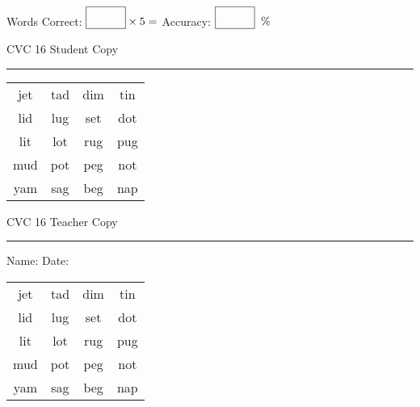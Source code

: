 \documentclass{memoir}
\begin{document}
\small

Words Correct: $\fbox{\phantom{\huge 100}} \times 5 = $ Accuracy: $\fbox{\phantom{\huge 100}}\;\; \%$ 

\vfill

\newpage


\footnotesize \noindent
CVC 16 \hfill Student Copy
\smallskip
\hrule

\Large

\setlength{\tabcolsep}{14pt}
\def\arraystretch{2}

{\selectfont


\begin{vplace}[0.5]
\begin{center}
\begin{tabular}{cccc}
jet & tad & dim & tin \\
lid & lug & set & dot \\
lit & lot & rug & pug \\
mud & pot & peg & not \\
yam & sag & beg & nap \\
\end{tabular}
\end{center}
\end{vplace}

}

\newpage

\footnotesize \noindent
CVC 16 \hfill Teacher Copy
\smallskip
\hrule

\small

\vfill

\noindent
Name: \underline{\hspace{1.75in}} \hfill Date: \underline{\hspace{1in}}

\Large

{\selectfont


\begin{vplace}[0.5]
\begin{center}
\begin{tabular}{cccc}
jet & tad & dim & tin \\
lid & lug & set & dot \\
lit & lot & rug & pug \\
mud & pot & peg & not \\
yam & sag & beg & nap \\
\end{tabular}
\end{center}
\end{vplace}



}
\end{document}
